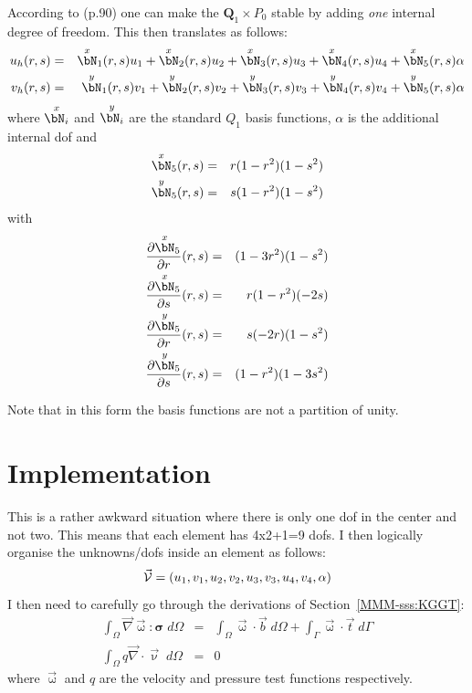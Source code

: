 According to \textcite{bobf08} (p.90) one can make the ${\bm Q}_1 \times P_0$ stable by adding {\it one}
internal degree of freedom. This then translates as follows:
\begin{eqnarray}
u_h(r,s) &=& 
\overset{\tiny x}{\bN}_1(r,s) u_1 +
\overset{\tiny x}{\bN}_2(r,s) u_2 +
\overset{\tiny x}{\bN}_3(r,s) u_3 +
\overset{\tiny x}{\bN}_4(r,s) u_4 + 
\overset{\tiny x}{\bN}_5(r,s) \alpha \\
v_h(r,s) &=& 
\overset{\small y}{\bN}_1(r,s) v_1 +
\overset{\small y}{\bN}_2(r,s) v_2 +
\overset{\small y}{\bN}_3(r,s) v_3 +
\overset{\small y}{\bN}_4(r,s) v_4 + 
\overset{\small y}{\bN}_5(r,s) \alpha 
\end{eqnarray}
where $\overset{\small x}{\bN_i}$ and $\overset{\small y}{\bN_i}$ 
are the standard $Q_1$ basis functions, $\alpha$ is the additional 
internal dof and 
\begin{eqnarray}
\overset{\small x}{\bN}_5(r,s) &=& r(1-r^2)(1-s^2) \\
\overset{\small y}{\bN}_5(r,s) &=& s(1-r^2)(1-s^2) 
\end{eqnarray}
with
\begin{eqnarray}
\frac{\partial \overset{\small x}{\bN}_5}{\partial r}(r,s) &=& (1-3r^2)(1-s^2) \\
\frac{\partial \overset{\small x}{\bN}_5}{\partial s}(r,s) &=& r(1-r^2)(-2s) \\
\frac{\partial \overset{\small y}{\bN}_5}{\partial r}(r,s) &=& s(-2r)(1-s^2) \\
\frac{\partial \overset{\small y}{\bN}_5}{\partial s}(r,s) &=& (1-r^2)(1-3s^2) 
\end{eqnarray}

Note that in this form the basis functions are not a partition of unity.


\section*{Implementation}

This is a rather awkward situation where there is only one dof in the center and not two. 
This means that each element has 4x2+1=9 dofs. 
I then logically organise the unknowns/dofs inside an element as follows:
\[
\vec{\cal V}=(u_1,v_1,u_2,v_2,u_3,v_3,u_4,v_4,\alpha)
\]
I then need to carefully go through the derivations of Section~\ref{MMM-sss:KGGT}:
\begin{eqnarray}
\int_\Omega \vec\nabla \vec{\upomega} : {\bm \sigma} \; d\Omega
&=& \int_\Omega \vec\upomega \cdot \vec{b} \; d\Omega 
+ \int_\Gamma \vec\upomega \cdot \vec{t} \; d\Gamma \\
\int_\Omega q \vec\nabla \cdot \vec{\upnu} \; d\Omega &=& 0
\end{eqnarray}
where $\vec\upomega$ and $q$ are the velocity and pressure test functions respectively. 

